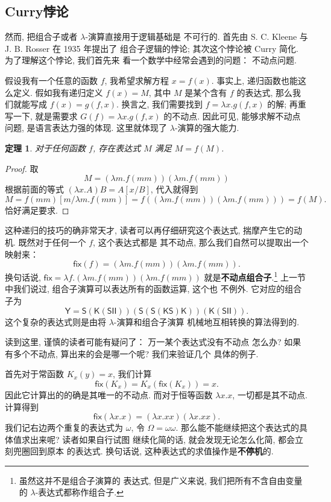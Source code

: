 \documentclass[UTF8]{ctexbook}
\newcommand{\cons}[1]{\textsf{#1}}
\theoremstyle{plain}
\newtheorem{theorem}{定理}[chapter]
\theoremstyle{definition}
\theoremstyle{remark}
\begin{document}
\subsection{Curry悖论}
然而, 把组合子或者 \(\lambda\)-演算直接用于逻辑基础是
不可行的. 首先由 S. C. Kleene 与 J. B. Rosser 在 1935 年提出了
组合子逻辑的悖论; 其次这个悖论被 Curry 简化. 为了理解这个悖论, 我们首先来
看一个数学中经常会遇到的问题： 不动点问题.

假设我有一个任意的函数 \(f\), 我希望求解方程 \(x = f(x)\).
事实上, 递归函数也能这么定义. 假如我有递归定义 \(f(x) = M\),
其中 \(M\) 是某个含有 \(f\) 的表达式, 那么我们就能写成
\(f(x) = g(f,x)\). 换言之, 我们需要找到 \(f = \lambda x. g(f,x)\)
的解; 再重写一下, 就是需要求 \(G(f) = \lambda x. g(f,x)\)
的不动点. 因此可见, 能够求解不动点问题, 是语言表达力强的体现.
这里就体现了 \(\lambda\)-演算的强大能力.

\begin{theorem}
对于任何函数 \(f\),
存在表达式 \(M\) 满足 \(M=f(M)\).
\end{theorem}
\begin{proof}
取
\[M = (\lambda m. f(mm))(\lambda m. f(mm))\]
根据前面的等式 \((\lambda x. A)B = A[x/B]\),
代入就得到
\[M = f(mm)[m/\lambda m.f(mm)]
= f((\lambda m. f(mm))(\lambda m.f(mm)))
= f(M).\]
恰好满足要求.
\end{proof}
这种递归的技巧的确非常天才, 读者可以再仔细研究这个表达式,
揣摩产生它的动机. 既然对于任何一个 \(f\), 这个表达式都是
其不动点, 那么我们自然可以提取出一个映射来：
\[\cons{fix}(f) = (\lambda m. f(mm)) (\lambda m. f(mm)).\]
换句话说, \(\cons{fix} = \lambda f. (\lambda m. f(mm)) (\lambda m. f(mm))\)
就是\textbf{不动点组合子}.\footnote{虽然这并不是组合子演算的
表达式, 但是广义来说, 我们把所有不含自由变量
的 \(\lambda\)-表达式都称作组合子.}
上一节中我们说过, 组合子演算可以表达所有的函数运算, 这个也
不例外. 它对应的组合子为
\[\cons{Y} = \cons{S}(\cons{K}(\cons{S}\cons{I}\cons{I}))
(\cons{S}(\cons{S}(\cons{K}\cons{S})\cons{K}))
(\cons{K}(\cons{S}\cons{I}\cons{I})).\]
这个复杂的表达式则是由将 \(\lambda\)-演算和组合子演算
机械地互相转换的算法得到的.

读到这里, 谨慎的读者可能有疑问了： 万一某个表达式没有不动点
怎么办? 如果有多个不动点, 算出来的会是哪一个呢? 我们来验证几个
具体的例子.

首先对于常函数 \(K_x(y) = x\), 我们计算
\[\cons{fix}(K_x) = K_x(\cons{fix}(K_x)) = x.\]
因此它计算出的的确是其唯一的不动点. 而对于恒等函数
\(\lambda x. x\), 一切都是其不动点. 计算得到
\[\cons{fix}(\lambda x.x) = (\lambda x.xx)(\lambda x.xx).\]
我们记右边两个重复的表达式为 \(\omega\), 令 \(\Omega = \omega\omega\).
那么能不能继续把这个表达式的具体值求出来呢? 读者如果自行试图
继续化简的话, 就会发现无论怎么化简, 都会立刻兜圈回到原本
的表达式. 换句话说, 这种表达式的求值操作是\textbf{不停机}的.
\end{document}
